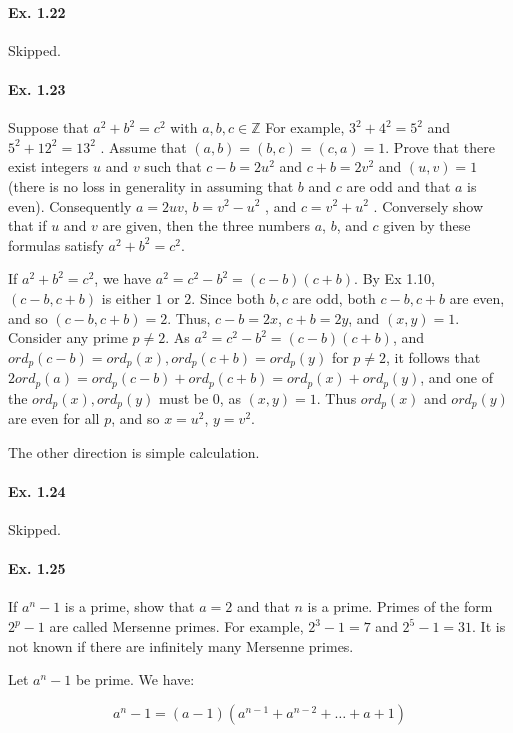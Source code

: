 \documentclass[notitlepage]{article}
\theoremstyle{definition}
\newcommand\Z{\mathbb{Z}}
\begin{document}
\paragraph{Ex. 1.22} Skipped.

\paragraph{Ex. 1.23}
Suppose that $a^2 + b^2 = c^2$ with $a, b, c \in \Z$ For example, $3^2 + 4^2 = 5^2$ and $5^2 +
12^2 = 13^2$ . Assume that $(a, b) = (b, c) = (c, a) = 1$. Prove that there exist integers $u$
and $v$ such that $c - b = 2u^2$ and $c + b = 2v^2$ and $(u, v) = 1$ (there is no loss in
generality in assuming that $b$ and $c$ are odd and that $a$ is even). Consequently $a = 2uv$,
$b = v^2 - u^2$ , and $c = v^2 + u^2$ . Conversely show that if $u$ and $v$ are given, then the
three numbers $a$, $b$, and $c$ given by these formulas satisfy $a^2 + b^2 = c^2$.

If $a^2 + b^2 = c^2$, we have $a^2 = c^2 - b^2 = (c-b)(c+b)$. By Ex
1.10, $(c-b, c+b)$ is either $1$ or $2$. Since both $b, c$ are odd,
both $c-b, c+b$ are even, and so $(c-b, c+b) = 2$. Thus, $c-b = 2x$,
$c+b = 2y$, and $(x, y) = 1$. Consider any prime $p \ne 2$. As $a^2 =
c^2 - b^2 = (c-b)(c+b)$, and $ord_p(c-b) = ord_p(x), ord_p(c+b) =
ord_p(y)$ for $p \ne 2$, it follows that $2 ord_p(a) = ord_p(c-b) +
ord_p(c+b) = ord_p(x) + ord_p(y)$, and one of the $ord_p(x), ord_p(y)$
must be $0$, as $(x, y) = 1$. Thus $ord_p(x)$ and $ord_p(y)$ are even
for all $p$, and so $x = u^2$, $y = v^2$.

The other direction is simple calculation.

\paragraph{Ex. 1.24} Skipped.

\paragraph{Ex. 1.25}
If $a^n - 1$ is a prime, show that $a = 2$ and that $n$ is a
prime. Primes of the form $2^p - 1$ are called Mersenne primes. For
example, $2^3 - 1 = 7$ and $2^5 - 1 = 31$. It is not known if there are
infinitely many Mersenne primes.

Let $a^n - 1$ be prime. We have:

\begin{equation}
  a^n - 1 = (a-1)(a^{n-1} + a^{n-2} + \ldots + a + 1)
\end{equation}
\end{document}
